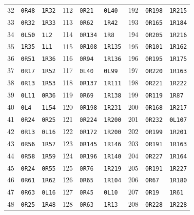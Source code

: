 \begin{longtable}{rll@{\hspace{0.45cm}}rll@{\hspace{0.45cm}}rll}
32 & \texttt{0R48} & \texttt{1R32} & 112 & \texttt{0R21} & \texttt{0L40} & 192 & \texttt{0R198} & \texttt{1R215} \\
33 & \texttt{0R32} & \texttt{1R33} & 113 & \texttt{0R62} & \texttt{1R42} & 193 & \texttt{0R165} & \texttt{1R184} \\
34 & \texttt{0L50} & \texttt{1L2} & 114 & \texttt{0R134} & \texttt{1R8} & 194 & \texttt{0R205} & \texttt{1R216} \\
35 & \texttt{1R35} & \texttt{1L1} & 115 & \texttt{0R108} & \texttt{1R135} & 195 & \texttt{0R101} & \texttt{1R162} \\
36 & \texttt{0R51} & \texttt{1R36} & 116 & \texttt{0R94} & \texttt{1R136} & 196 & \texttt{0R195} & \texttt{1R175} \\
37 & \texttt{0R17} & \texttt{1R52} & 117 & \texttt{0L40} & \texttt{0L99} & 197 & \texttt{0R220} & \texttt{1R163} \\
38 & \texttt{0R13} & \texttt{1R53} & 118 & \texttt{0R137} & \texttt{1R111} & 198 & \texttt{0R221} & \texttt{1R222} \\
39 & \texttt{0L11} & \texttt{0R36} & 119 & \texttt{0R69} & \texttt{1R138} & 199 & \texttt{0R119} & \texttt{1R87} \\
40 & \texttt{0L4} & \texttt{1L54} & 120 & \texttt{0R198} & \texttt{1R231} & 200 & \texttt{0R168} & \texttt{1R217} \\
41 & \texttt{0R24} & \texttt{0R25} & 121 & \texttt{0R224} & \texttt{1R200} & 201 & \texttt{0R232} & \texttt{0L107} \\
42 & \texttt{0R13} & \texttt{0L16} & 122 & \texttt{0R172} & \texttt{1R200} & 202 & \texttt{0R199} & \texttt{1R201} \\
43 & \texttt{0R56} & \texttt{1R57} & 123 & \texttt{0R145} & \texttt{1R146} & 203 & \texttt{0R191} & \texttt{1R163} \\
44 & \texttt{0R58} & \texttt{1R59} & 124 & \texttt{0R196} & \texttt{1R140} & 204 & \texttt{0R227} & \texttt{1R164} \\
45 & \texttt{0R24} & \texttt{0R55} & 125 & \texttt{0R76} & \texttt{1R219} & 205 & \texttt{0R191} & \texttt{1R227} \\
46 & \texttt{0R61} & \texttt{1R62} & 126 & \texttt{0R65} & \texttt{1R104} & 206 & \texttt{0R67} & \texttt{1R180} \\
47 & \texttt{0R63} & \texttt{0L16} & 127 & \texttt{0R45} & \texttt{0L10} & 207 & \texttt{0R19} & \texttt{1R61} \\
48 & \texttt{0R25} & \texttt{1R48} & 128 & \texttt{0R63} & \texttt{1R13} & 208 & \texttt{0R228} & \texttt{1R228} \\

\end{longtable}
